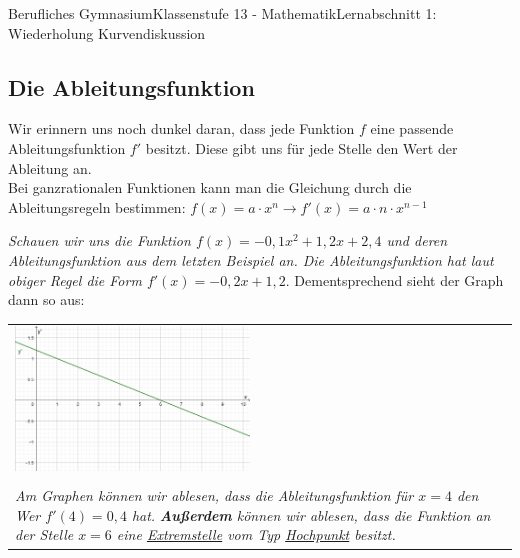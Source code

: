 \documentclass[11pt,twocolumn,oneside,openany,headings=optiontotoc,11pt,numbers=noenddot]{article}
\begin{document}
\begin{worksheet}{Berufliches Gymnasium}{Klassenstufe 13 - Mathematik}{Lernabschnitt 1: Wiederholung Kurvendiskussion}
		\subsection{Die Ableitungsfunktion}
		Wir erinnern uns noch dunkel daran, dass jede Funktion \(f\) eine passende Ableitungsfunktion \(f'\) besitzt. Diese gibt uns für jede Stelle den Wert der Ableitung an.\\
		Bei ganzrationalen Funktionen kann man die Gleichung durch die Ableitungsregeln bestimmen: \(f(x) = a\cdot{}x^n\rightarrow{}f'(x) = a\cdot{}n\cdot{}x^{n-1}\)\\
		\par\bigskip\noindent
		\textit{Schauen wir uns die Funktion \(f(x) = -0,1x^2 + 1,2x +2,4\) und deren Ableitungsfunktion aus dem letzten Beispiel an. Die Ableitungsfunktion hat laut obiger Regel die Form \(f'(x) = -0,2x + 1,2\)}. Dementsprechend sieht der Graph dann so aus:\\
		\par\bigskip\noindent
		\begin{tabularx}{0.5\textwidth}{X}
			\includegraphics[width=0.48\textwidth]{../99_Bilder/00_Wdh/KiTa'.png}\\
			\\
			\textit{Am Graphen können wir ablesen, dass die Ableitungsfunktion für \(x=4\) den Wer \(f'(4)=0,4\) hat.}
			\textit{\textbf{Außerdem} können wir ablesen, dass die Funktion an der Stelle \(x=6\) eine \underline{Extremstelle} vom Typ \underline{Hochpunkt} besitzt.}
		\end{tabularx}

\end{worksheet}
\end{document}
